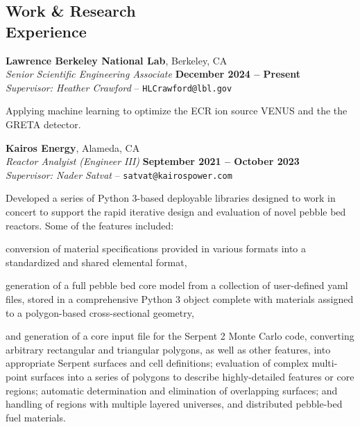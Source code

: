 \documentclass[margin,line]{resume}
\begin{document}
\begin{resume}
    \section{\mysidestyle Work \& Research \\Experience}
     \textbf{Lawrence Berkeley National Lab}, Berkeley, CA \\
                \textsl{Senior Scientific Engineering Associate} \hfill
                \textbf{December 2024 -- Present} \\
                \textsl{Supervisor: Heather Crawford} -- \verb`HLCrawford@lbl.gov`
                \begin{list2}
                \item[] Applying machine learning to optimize the ECR ion source VENUS and the the GRETA detector.
                \end{list2}
    \textbf{Kairos Energy}, Alameda, CA \\
                \textsl{Reactor Analyist (Engineer III)} \hfill
                \textbf{September 2021 -- October 2023} \\
                \textsl{Supervisor: Nader Satvat} -- \verb`satvat@kairospower.com`
                \begin{list2}
                \item[] Developed a series of Python 3-based deployable libraries designed to work in concert to support the rapid iterative design and evaluation of novel pebble bed reactors. Some of the features included:
                \begin{list2}
                \item conversion of material specifications provided in various formats into a standardized and shared elemental format,
                \item generation of a full pebble bed core model from a collection of user-defined yaml files, stored in a comprehensive Python 3 object complete with materials assigned to a polygon-based cross-sectional geometry,
                \item and generation of a core input file for the Serpent 2 Monte Carlo code, converting arbitrary rectangular and triangular polygons, as well as other features, into appropriate Serpent surfaces and cell definitions; evaluation of complex multi-point surfaces into a series of polygons to describe highly-detailed features or core regions; automatic determination and elimination of overlapping surfaces; and handling of regions with multiple layered universes, and distributed pebble-bed fuel materials.

\end{list2}
\end{list2}
\end{resume}
\end{document}
